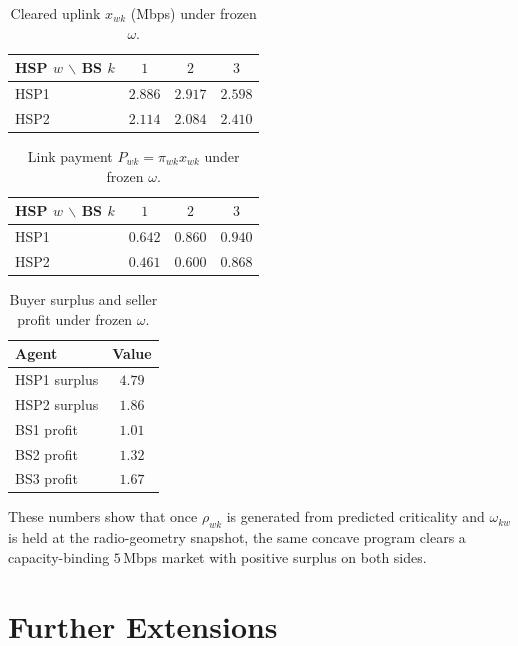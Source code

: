 \documentclass[journal,a4paper,10pt]{IEEEtran}
\begin{document}
\begin{table}[!t]
\caption{Cleared uplink \(x_{wk}\) (Mbps) under frozen \(\omega\).}
\label{tab:rates-d}
\centering
\begin{tabular}{@{}lccc@{}}
\toprule
HSP \(w\) \(\backslash\) BS \(k\) & \(1\) & \(2\) & \(3\) \\
\midrule
HSP1  & \(2.886\) & \(2.917\) & \(2.598\) \\
HSP2  & \(2.114\) & \(2.084\) & \(2.410\) \\
\bottomrule
\end{tabular}
\end{table}

\begin{table}[!t]
\caption{Link payment \(P_{wk}=\pi_{wk}x_{wk}\) under frozen \(\omega\).}
\label{tab:pay-d}
\centering
\begin{tabular}{@{}lccc@{}}
\toprule
HSP \(w\) \(\backslash\) BS \(k\) & \(1\) & \(2\) & \(3\) \\
\midrule
HSP1  & \(0.642\) & \(0.860\) & \(0.940\) \\
HSP2  & \(0.461\) & \(0.600\) & \(0.868\) \\
\bottomrule
\end{tabular}
\end{table}

\begin{table}[!t]
\caption{Buyer surplus and seller profit under frozen \(\omega\).}
\label{tab:surplus}
\centering
\begin{tabular}{@{}lc@{}}
\toprule
Agent & Value \\
\midrule
HSP1 surplus & \(4.79\) \\
HSP2 surplus & \(1.86\) \\
BS1 profit & \(1.01\) \\
BS2 profit & \(1.32\) \\
BS3 profit & \(1.67\) \\
\bottomrule
\end{tabular}
\end{table}

These numbers show that once \(\rho_{wk}\) is generated from predicted criticality and \(\omega_{kw}\) is held at the radio-geometry snapshot, the same concave program clears a capacity-binding \(5\)\,Mbps market with positive surplus on both sides.

\section{Further Extensions}
\label{sec:ext}
\end{document}

